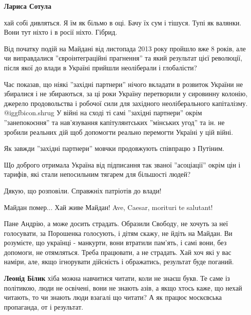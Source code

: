 \begin{itemize}
\begin{itemize}
\textbf{Лариса Сотула} 

хай собі дивляться. Я їм як більмо в оці. Бачу їх сум і тішуся. Тупі як
валянки. Вони тут ніхто і в росії ніхто. Гібрид.

\end{itemize} %


Від початку подій на Майдані від листопада 2013 року пройшло вже 8 років, але
чи виправдалися ''євроінтеграційні прагнення'' та який результат цієї
революції, після якої до влади в Україні прийшли неоліберали і глобалісти?

Час показав, що ніякі ''західні партнери'' нічого вкладати в розвиток України
не збиралися і не збираються, за ці роки Україну перетворили у сировинну
колонію, джерело продовольства і робочої сили для західного неоліберального
капіталізму. @igg{fbicon.shrug}  У війні на сході ті самі ''західні партнери'' окрім
''занепокоєння'' та нав'язування капітулянтських ''мінських угод'' та ін. не
зробили реальних дій щоб допомогти реально перемогти Україні у цій війні.

Як завжди ''західні партнери'' мовчки продовжують співпрацю з Путіним.

Що доброго отримала Україна від підписання так званої ''асоціації'' окрім цін і
тарифів, які стали непосильним тягарем для більшості людей?

Дякую, що розповіли. Справжніх патріотів до влади!

Майдан помер...
Хай живе Майдан!
Ave, Caesar, morituri te salutant!


Пане Андрію, а може досить страдать. Образили Свободу, не хочуть за неї
голосувати, за Порошенка голосують, і дітям скажу, не йдіть на Майдан. Ви
розумієте, що українці - манкурти, вони втратили пам'ять, і самі вони, без
допомоги, не отямляться. Треба працювати, а не страдать. Хай хоч які у вас
наміри, але, якщо ігнорувати дійсність і ображатись, результат буде поганий.

\begin{itemize} %
\textbf{Леонід Білик} хіба можна навчитися читати, коли не знаєш букв. Те саме із політикою, люди не освічені, вони не знають азів, а якщо хтось каже, що нехай читають, то чи знають люди взагалі що читати? А як працює москєвська пропаганда, от і результат.


\end{itemize}
\end{itemize}
